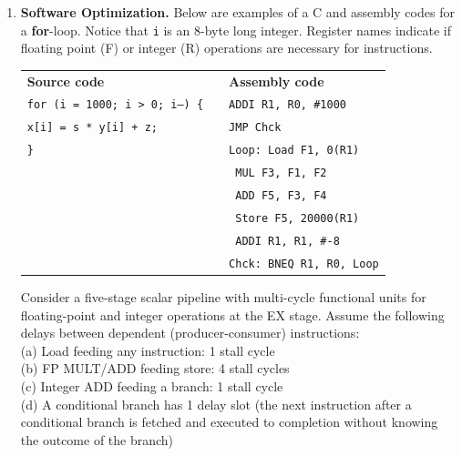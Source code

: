 \documentclass[a4paper, 11pt]{exam}
\begin{document}
\begin{enumerate}
\begin{enumerate}
\end{enumerate}


\item \textbf {Software Optimization.}
Below are examples of a C and assembly codes for a \textbf{for}-loop.
Notice that \texttt{i} is an 8-byte long integer. Register names indicate if floating point (F) or integer (R) operations are necessary for instructions.

\begin{tabular}{lll}
	\textbf{Source code} & & \textbf{Assembly code }\\
	\texttt{for (i = 1000; i > 0; i--) \{}&  &\hspace{40pt}\texttt{ADDI R1, R0, \#1000} \\
	\hspace{20pt}\texttt{x[i] = s * y[i] + z;} &  &\hspace{40pt}\texttt{JMP Chck}\\
	\texttt{\}} &  &\texttt{Loop: Load F1, 0(R1)} \\
    &  &\hspace{35pt}\texttt{ MUL F3, F1, F2}\\
	&  &\hspace{35pt}\texttt{ ADD F5, F3, F4}\\
	&  &\hspace{35pt}\texttt{ Store F5, 20000(R1)}\\
	&  &\hspace{35pt}\texttt{ ADDI R1, R1, \#-8}\\
	&  &\texttt{Chck: BNEQ R1, R0, Loop}\\
\end{tabular}

Consider a five-stage scalar pipeline with multi-cycle functional units for floating-point and integer operations at the EX stage.
Assume the following delays between dependent (producer-consumer) instructions:\\
(a) Load feeding any instruction: 1 stall cycle\\
(b) FP MULT/ADD feeding store: 4 stall cycles\\
(c) Integer ADD feeding a branch: 1 stall cycle\\
(d) A conditional branch has 1 delay slot (the next instruction after a conditional branch is fetched and executed to completion without knowing the outcome of the branch)


\end{enumerate}
\end{document}
